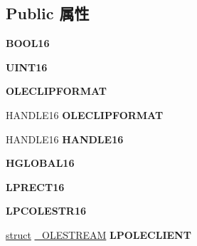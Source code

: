 \subsection*{Public 属性}
\begin{DoxyCompactItemize}
\item 
\mbox{\label{struct___o_l_e_o_b_j_e_c_t_v_t_b_l_ac685cb4f35c11e97cf83381b5cca9d40}} 
{\bfseries B\+O\+O\+L16}
\item 
\mbox{\label{struct___o_l_e_o_b_j_e_c_t_v_t_b_l_a4ef8b46a2eaa109849ffcd851dbff92f}} 
{\bfseries U\+I\+N\+T16}
\item 
\mbox{\label{struct___o_l_e_o_b_j_e_c_t_v_t_b_l_aa9fc6c0196ccc0f4b498a67362c38ea3}} 
{\bfseries O\+L\+E\+C\+L\+I\+P\+F\+O\+R\+M\+AT}
\item 
\mbox{\label{struct___o_l_e_o_b_j_e_c_t_v_t_b_l_a735afca6af0f97748caed43d9a72634c}} 
H\+A\+N\+D\+L\+E16 {\bfseries O\+L\+E\+C\+L\+I\+P\+F\+O\+R\+M\+AT}
\item 
\mbox{\label{struct___o_l_e_o_b_j_e_c_t_v_t_b_l_a53ae4eadd623149893bb8f1ab0b312d4}} 
H\+A\+N\+D\+L\+E16 {\bfseries H\+A\+N\+D\+L\+E16}
\item 
\mbox{\label{struct___o_l_e_o_b_j_e_c_t_v_t_b_l_a61eb0f4256716f45c52e221e6a6aa27c}} 
{\bfseries H\+G\+L\+O\+B\+A\+L16}
\item 
\mbox{\label{struct___o_l_e_o_b_j_e_c_t_v_t_b_l_a4aebed84321f2eca99cf297cf15401fb}} 
{\bfseries L\+P\+R\+E\+C\+T16}
\item 
\mbox{\label{struct___o_l_e_o_b_j_e_c_t_v_t_b_l_a4621b6849f362af335bae937738acec4}} 
{\bfseries L\+P\+C\+O\+L\+E\+S\+T\+R16}
\item 
\mbox{\label{struct___o_l_e_o_b_j_e_c_t_v_t_b_l_a592157dea5b65552baca89eb497d143c}} 
\hyperlink{interfacestruct}{struct} \hyperlink{struct___o_l_e_s_t_r_e_a_m}{\+\_\+\+O\+L\+E\+S\+T\+R\+E\+AM} {\bfseries L\+P\+O\+L\+E\+C\+L\+I\+E\+NT}

\end{DoxyCompactItemize}
